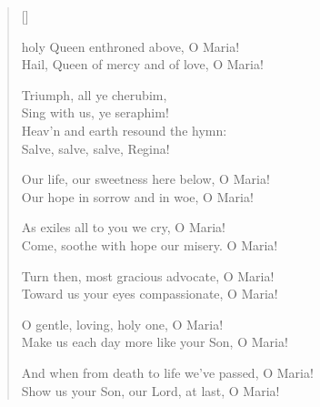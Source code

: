 \newHymn




\begin{verse}[\versewidth]

 holy Queen enthroned above, O Maria!\\
Hail, Queen of mercy and of love, O Maria!

\begin{indentedVerse}
\vin Triumph, all ye cherubim,\\
\vin Sing with us, ye seraphim!\\
\vin Heav'n and earth resound the hymn:\\
\vin Salve, salve, salve, Regina!
\end{indentedVerse}

Our life, our sweetness here below, O Maria!\\
Our hope in sorrow and in woe, O Maria!

As exiles all to you we cry, O Maria!\\
Come, soothe with hope our misery. O Maria!

Turn then, most gracious advocate, O Maria!\\
Toward us your eyes compassionate, O Maria!

O gentle, loving, holy one, O Maria!\\
Make us each day more like your Son, O Maria!

And when from death to life we've passed, O Maria!\\
Show us your Son, our Lord, at last, O Maria!

\end{verse}

